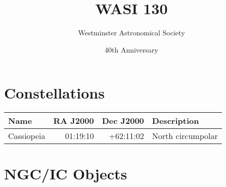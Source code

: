 \documentclass[11pt]{article}
\date{40th Anniversary}
\author{Westminster Astronomical Society}
\title{WASI 130}
\begin{document}
\maketitle           %


\section*{Constellations}

\begin{tabular}{lrrl} \toprule
  Name       & RA J2000 & Dec J2000 & Description       \\ \midrule
  Cassiopeia & 01:19:10 & +62:11:02 & North circumpolar \\
  \bottomrule
\end{tabular}

\section*{NGC/IC Objects}
\end{document}
